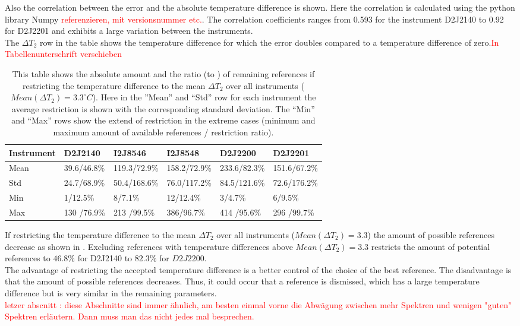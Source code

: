 Also the correlation between the  error and the absolute temperature difference is shown. Here the correlation is calculated using the python library Numpy \textcolor{red}{referenzieren, mit versionsnummer etc.}. The correlation coefficients ranges from 0.593 for the instrument D2J2140 to  0.92 for D2J2201 and exhibits a large variation between the instruments.\\
The $\Delta T_{2}$ row in the table shows the temperature difference for which the error doubles compared to a temperature difference of zero.\textcolor{red}{In Tabellenunterschrift verschieben}\\
\begin{table}
	\centering
	\begin{tabular}{|p{1.8cm}|p{2.15cm}|p{2.15cm}|p{2.15cm}|p{2.15cm}|p{2.15cm}|}
		Instrument	&D2J2140&I2J8546& I2J8548&D2J2200&D2J2201\\
		\toprule
		Mean&
		39.6/46.8\%&
		119.3/72.9\%
		&158.2/72.9\%
		&233.6/82.3\%
		&151.6/67.2\%\\
		\midrule
		Std&
		24.7/68.9\%&
		50.4/168.6\%&
		76.0/117.2\%&
		84.5/121.6\%&
		72.6/176.2\%\\
		\midrule
		Min&
		1/12.5\%
		&8/7.1\%&
		12/12.4\%&
		3/4.7\% &
		6/9.5\%\\
		\midrule
		Max
		&
		130	/76.9\%&
		213	/99.5\%&
		386/96.7\%&
		414	/95.6\% &
		296	/99.7\%\\
		\bottomrule
	\end{tabular}
	\caption{This table shows the absolute amount and the ratio (to ) of remaining references if restricting the temperature difference to the mean $\Delta T_{2}$ over all instruments ($Mean(\Delta T_{2}) = 3.3^{\circ}C$). Here in the ”Mean” and “Std” row for each  instrument the average restriction is shown with the corresponding standard deviation. The “Min” and “Max” rows show the extend of restriction in the extreme cases (minimum and maximum amount of available references / restriction ratio).}
	\label{tab:decTemp}
\end{table}	
If restricting the temperature difference to the mean $\Delta T_{2}$ over all instruments ($Mean(\Delta T_{2}) = 3.3$) the amount of possible references decrease as shown in . Excluding references with temperature differences above $Mean(\Delta T_{2}) = 3.3$ restricts the amount of potential references to $46.8\%$ for D2J2140 to $82.3\%$ for $D2J2200$.\\
The advantage of restricting the accepted temperature difference is a better control of the choice of the best reference. The disadvantage is that the amount of possible references decreases. Thus, it could occur that a reference is dismissed, which has a large temperature difference but is very similar in the remaining parameters.\\
\textcolor{red}{letzer abscnitt : diese Abschnitte sind immer ähnlich, am besten einmal vorne die Abwägung zwischen mehr Spektren und wenigen "guten" Spektren erläutern. Dann muss man das nicht jedes mal besprechen.}
